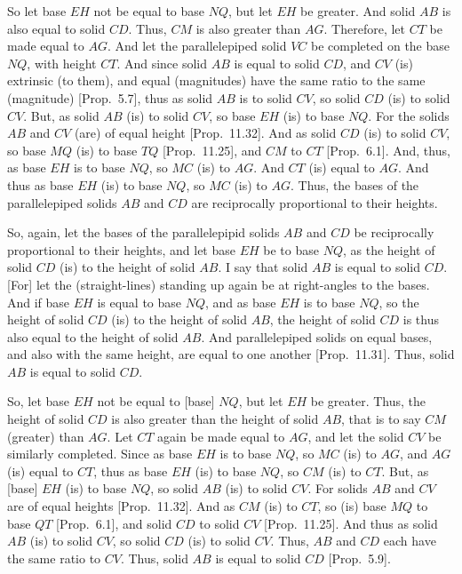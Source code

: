 \begin{Parallel}{}{}
{So let base $EH$ not be equal to base $NQ$, but let $EH$ be greater. And
solid $AB$ is also equal to solid $CD$. Thus, $CM$ is also greater than $AG$.  Therefore, let $CT$ be made equal to $AG$. And let the parallelepiped
solid $VC$ be completed on the base $NQ$, with height $CT$.
And since solid $AB$ is equal to solid $CD$, and $CV$ (is)
extrinsic (to them), and equal (magnitudes) have the same ratio to the
same (magnitude) [Prop.~5.7], thus as solid
$AB$ is to solid $CV$, so solid $CD$ (is) to solid $CV$. But, as
solid $AB$ (is) to solid $CV$, so base $EH$ (is) to base $NQ$. For the solids $AB$ and $CV$ (are) of equal
height [Prop.~11.32]. And as solid $CD$ (is) to solid $CV$, so base $MQ$ (is) to 
base $TQ$ [Prop.~11.25], and $CM$ to $CT$
[Prop.~6.1].
And, thus, as base $EH$ is to base $NQ$, so $MC$ (is) to $AG$.
And $CT$ (is) equal to $AG$. And
thus as base $EH$ (is) to base $NQ$, so $MC$ (is) to $AG$. Thus, the
bases of the parallelepiped solids $AB$ and $CD$ are reciprocally proportional to their
heights.

So, again, let the bases of the parallelepipid solids $AB$ and $CD$
be reciprocally proportional to their heights, and let base $EH$
be to base $NQ$, as the height of solid $CD$ (is) to the
height of solid $AB$. I say that solid $AB$ is equal to solid $CD$.
\mbox{[}For] let the (straight-lines) standing up again be at right-angles to the
bases. And if base $EH$ is equal to base $NQ$, and as base $EH$
is to base $NQ$, so the height of solid $CD$ (is) to the
height of solid $AB$, the height of solid $CD$ is thus also
equal to the height of solid $AB$. And parallelepiped solids on equal
bases, and also with the same height,  are equal to one another [Prop.~11.31]. Thus, solid $AB$ is equal to solid $CD$.

So, let base $EH$ not be equal to [base] $NQ$, but let $EH$ be greater.
Thus, the height of solid $CD$ is also greater than the height of
solid $AB$, that is to say $CM$ (greater) than $AG$. Let $CT$ again
be made equal to $AG$, and let the solid $CV$ be similarly
completed.  Since as base $EH$ is to base $NQ$, so $MC$ (is) to
$AG$, and $AG$ (is) equal to $CT$, thus as base $EH$ (is) to
base $NQ$, so $CM$ (is) to $CT$.  But, as [base] $EH$ (is) to base
$NQ$, so solid $AB$ (is) to solid $CV$. For solids $AB$ and $CV$ are of equal heights [Prop.~11.32].
And as $CM$ (is) to $CT$, so (is) base $MQ$ to base $QT$ [Prop.~6.1], and solid $CD$ to solid $CV$ [Prop.~11.25]. And thus as solid $AB$ (is) to solid
$CV$, so solid $CD$ (is) to solid $CV$. Thus, $AB$ and $CD$ each
have the same ratio to $CV$. Thus, solid $AB$ is equal to solid
$CD$ [Prop.~5.9].\\~\\~\\~\\~\\

}
\end{Parallel}
